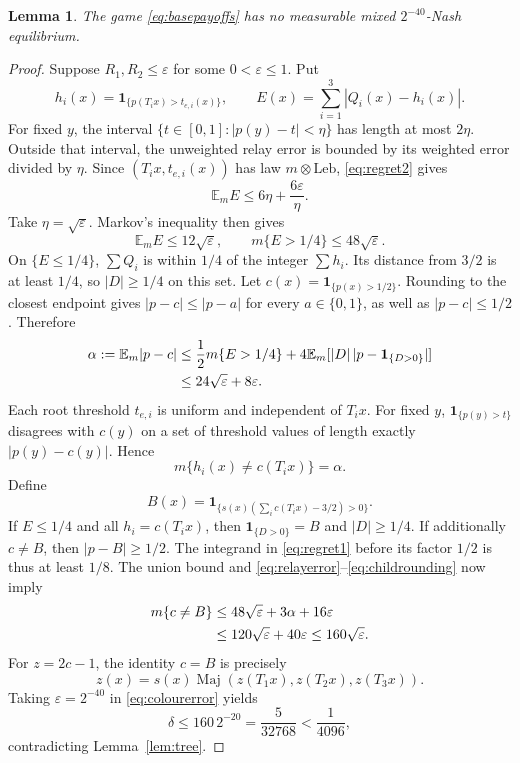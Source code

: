 \documentclass[11pt]{article}
\newtheorem{lemma}[theorem]{Lemma}
\theoremstyle{remark}
\newcommand{\E}{\mathbb E}
\newcommand{\ind}{\mathbf 1}
\newcommand{\Maj}{\operatorname{Maj}}
\begin{document}
\begin{lemma}\label{lem:base}
The game \eqref{eq:basepayoffs} has no measurable mixed
$2^{-40}$-Nash equilibrium.
\end{lemma}
\begin{proof}
Suppose $R_1,R_2\le\varepsilon$ for some $0<\varepsilon\le1$.
Put
\[
 h_i(x)=\ind_{\{p(T_i x)>t_{e,i}(x)\}},\qquad
 E(x)=\sum_{i=1}^3|Q_i(x)-h_i(x)|.
\]
For fixed $y$, the interval
$\{t\in[0,1]:|p(y)-t|<\eta\}$ has length at most $2\eta$.
Outside that interval, the unweighted relay error is bounded by its
weighted error divided by $\eta$. Since
$(T_i x,t_{e,i}(x))$ has law $m\otimes\mathrm{Leb}$,
\eqref{eq:regret2} gives
\[
 \E_m E\le6\eta+\frac{6\varepsilon}{\eta}.
\]
Take $\eta=\sqrt\varepsilon$. Markov's inequality then gives
\begin{equation}\label{eq:relayerror}
 \E_m E\le12\sqrt\varepsilon,
 \qquad m\{E>1/4\}\le48\sqrt\varepsilon.
\end{equation}
On $\{E\le1/4\}$, $\sum Q_i$ is within $1/4$ of the integer
$\sum h_i$. Its distance from $3/2$ is at least $1/4$, so
$|D|\ge1/4$ on this set. Let
$c(x)=\ind_{\{p(x)>1/2\}}$. Rounding to the closest endpoint gives
$|p-c|\le|p-a|$ for every $a\in\{0,1\}$, as well as
$|p-c|\le1/2$. Therefore
\begin{align}
 \alpha:=\E_m|p-c|
 &\le\frac12m\{E>1/4\}
       +4\E_m[|D|\,|p-\ind_{\{D>0\}}|]\notag\\
 &\le24\sqrt\varepsilon+8\varepsilon.
 \label{eq:rounding}
\end{align}
Each root threshold $t_{e,i}$ is uniform and independent of $T_i x$.
For fixed $y$, $\ind_{\{p(y)>t\}}$ disagrees with $c(y)$ on a set
of threshold values of length exactly $|p(y)-c(y)|$. Hence
\begin{equation}\label{eq:childrounding}
 m\{h_i(x)\ne c(T_i x)\}=\alpha.
\end{equation}
Define
\[
 B(x)=\ind_{\{s(x)(\sum_i c(T_i x)-3/2)>0\}}.
\]
If $E\le1/4$ and all $h_i=c(T_i x)$, then
$\ind_{\{D>0\}}=B$ and $|D|\ge1/4$. If additionally $c\ne B$,
then $|p-B|\ge1/2$. The integrand in \eqref{eq:regret1} before its
factor $1/2$ is thus at least $1/8$. The union bound and
\eqref{eq:relayerror}--\eqref{eq:childrounding} now imply
\begin{align}
 m\{c\ne B\}
 &\le48\sqrt\varepsilon+3\alpha+16\varepsilon\notag\\
 &\le120\sqrt\varepsilon+40\varepsilon
 \le160\sqrt\varepsilon.
 \label{eq:colourerror}
\end{align}
For $z=2c-1$, the identity $c=B$ is precisely
\[
 z(x)=s(x)\Maj(z(T_1x),z(T_2x),z(T_3x)).
\]
Taking $\varepsilon=2^{-40}$ in \eqref{eq:colourerror} yields
\[
 \delta\le160\,2^{-20}=\frac5{32768}<\frac1{4096},
\]
contradicting Lemma~\ref{lem:tree}.
\end{proof}
\end{document}
